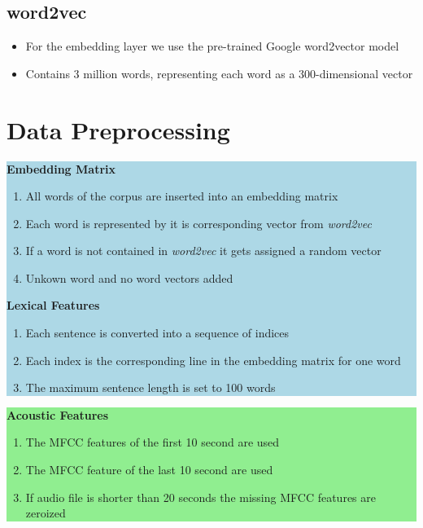 \documentclass[a0,landscape]{a0poster}
\begin{document}
\begin{multicols}{3}
\subsection*{word2vec}
\begin{itemize}
	\item For the embedding layer we use the pre-trained Google word2vector model
	\item Contains 3 million words, representing each word as a 300-dimensional vector
\end{itemize}

\large
\section*{Data Preprocessing}
\colorbox{lightblue}{
	\parbox{1025pt}{
		\vspace{0.5cm}
		{\Large \textbf{Embedding Matrix}}
		\begin{enumerate}
			\item All words of the corpus are inserted into an embedding matrix
			\item Each word is represented by it is corresponding vector from \textit{word2vec}
			\item If a word is not contained in \textit{word2vec} it gets assigned a random vector
			\item Unkown word and no word vectors added
		\end{enumerate}
		\vspace{0.5cm}
		{\Large \textbf{Lexical Features}}
		\begin{enumerate}	
			\item Each sentence is converted into a sequence of indices
			\item Each index is the corresponding line in the embedding matrix for one word
			\item The maximum sentence length is set to 100 words
		\end{enumerate}
}}
\colorbox{lightgreen}{
	\parbox{1025pt}{
		\vspace{0.5cm}
		{\Large \textbf{Acoustic Features}}
		\begin{enumerate}
			\item The MFCC features of the first 10 second are used
			\item The MFCC feature of the last 10 second are used 
			\item If audio file is shorter than 20 seconds the missing MFCC features are zeroized
		\end{enumerate}
	}}


\end{multicols}
\end{document}
